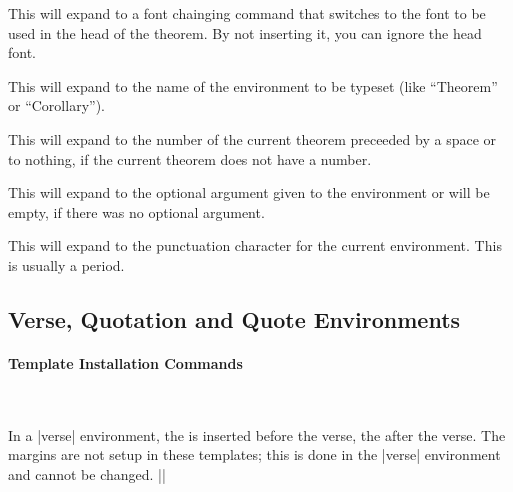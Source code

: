 \begin{command}{\inserttheoremheadfont}
  This will expand to a font chainging command that switches to the
  font to be used in the head of the theorem. By not inserting it, you
  can ignore the head font.
\end{command}

\begin{command}{\inserttheoremname}
  This will expand to the name of the environment to be typeset (like
  ``Theorem'' or ``Corollary''). 
\end{command}


\begin{command}{\inserttheoremnumber}
  This will expand to the number of the current theorem preceeded by a
  space or to nothing, if the current theorem does not have a number.
\end{command}

\begin{command}{\inserttheoremaddition}
  This will expand to the optional argument given to the environment
  or will be empty, if there was no optional argument.
\end{command}

\begin{command}{\inserttheorempunctuation}
  This will expand to the punctuation character for the current
  environment. This is usually a period.
\end{command}





\subsection{Verse, Quotation and Quote Environments}


\paragraph{Template Installation Commands}\

\begin{command}{\usetemplateverse{}}
  In a |verse| environment, the  is
  inserted before the verse, the  after the
  verse. The margins are not setup in these templates; this is done in
  the |verse| environment and cannot be changed.
  \example |\usetemplateverse{\rmfamily\itshape}{}|
\end{command}


